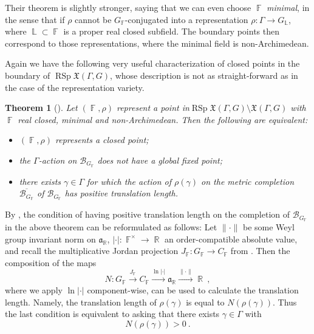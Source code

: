 \documentclass{amsart}
\theoremstyle{plain}
\newtheorem{theorem}[proposition]{Theorem}
\theoremstyle{definition}
\DeclareMathOperator{\rsp}{RSp}
\DeclareMathOperator{\Fb}{{\mathbb{F}}}
\DeclareMathOperator{\Lb}{\mathbb{L}}
\DeclareMathOperator{\Rb}{{\mathbb{R}}}
\newcommand{\abs}[1]{\left|#1\right|}
\newcommand{\1}{\mathbf{1}}
\begin{document}
Their theorem is slightly stronger, saying that we can even choose $\Fb$ \emph{minimal}, in the sense that if $\rho$ cannot be $G_{\Fb}$-conjugated into a representation $\rho \colon \Gamma \to G_{\Lb}$, where $\Lb \subset \Fb$ is a proper real closed subfield.
The boundary points then correspond to those representations, where the minimal field is non-Archimedean.

Again we have the following very useful characterization of closed points in the boundary of $\rsp\mathfrak{X}(\Gamma,G)$, whose description is not as straight-forward as in the case of the representation variety.

\begin{theorem}[{\cite[Theorem 1.2]{BurgerIozziParreauPozzetti_RSCCharacterVarieties2}}]
    Let $(\Fb, \rho)$ represent a point in\break $\rsp\mathfrak{X}(\Gamma,G) \setminus \mathfrak{X}(\Gamma,G)$ with $\Fb$ real closed, minimal and non-Archimedean.
    Then the following are equivalent:
    \begin{itemize}
        \item $(\Fb,\rho)$ represents a closed point;
        \item the $\Gamma$-action on $\mathcal{B}_{G_{\Fb}}$ does not have a global fixed point;
        \item there exists $\gamma \in \Gamma$ for which the action of $\rho(\gamma)$  on the metric completion $\overline{\mathcal{B}_{G_{\Fb}}}$ of $\mathcal{B}_{G_{\Fb}}$ has positive translation length.
    \end{itemize}
\end{theorem}


By \cite[Proposition 5.21]{BurgerIozziParreauPozzetti_RSCCharacterVarieties2}, 
the condition of having positive translation length on the completion of $\mathcal{B}_{G_{\Fb}}$ in the above theorem can be reformulated as follows:
Let $\| \cdot \|$ be some Weyl group invariant norm on $\mathfrak{a}_{\Rb}$, $\abs{\cdot} \colon \Fb^\times \to \Rb$ an order-compatible absolute value, and recall the multiplicative Jordan projection $J_{\Fb} \colon G_{\Fb} \to C_{\Fb}$ from .
Then the composition of the maps
\[N \colon G_{\Fb} \xrightarrow{J_{\Fb}} C_{\Fb} \xrightarrow{\ln\abs{\cdot}} \mathfrak{a}_{\Rb} \xrightarrow{\|\cdot\|} \Rb~,\]
where we apply $\ln\abs{\cdot}$ component-wise, can be used to calculate the translation length.
Namely, the translation length of $\rho(\gamma)$ is equal to $N(\rho(\gamma))$.
Thus the last condition is equivalent to asking that there exists $\gamma \in \Gamma$ with
\[ N(\rho(\gamma))>0~.\]
\end{document}

